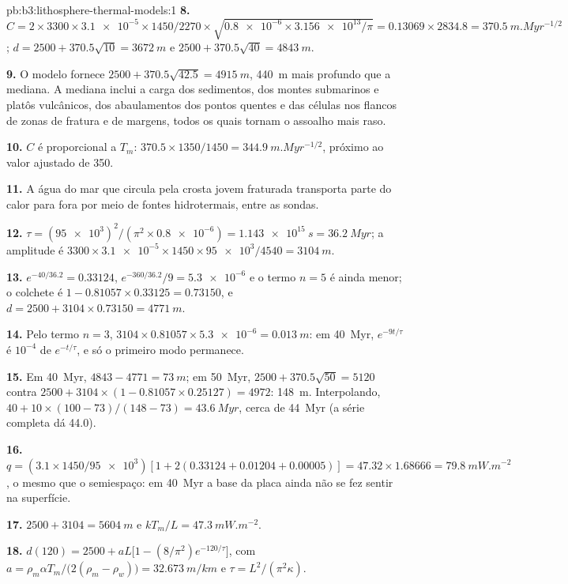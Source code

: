 \begin{solution}{pb:b3:lithosphere-thermal-models:1}
\textbf{8.} $C = 2\times3300\times\num{3.1e-5}\times1450/2270\times
\sqrt{\num{0.8e-6}\times\num{3.156e13}/\pi} = 0.13069\times2834.8 =
\qty{370.5}{m.Myr^{-1/2}}$; $d = 2500 + 370.5\sqrt{10} = \qty{3672}{m}$ e
$2500 + 370.5\sqrt{40} = \qty{4843}{m}$.

\textbf{9.} O modelo fornece $2500 + 370.5\sqrt{42.5} = \qty{4915}{m}$,
\qty{440}{m} mais profundo que a mediana. A mediana inclui a carga dos
sedimentos, dos montes submarinos e platôs vulcânicos, dos abaulamentos dos pontos quentes e
das células nos flancos de zonas de fratura e de margens, todos os quais tornam o assoalho
mais raso.

\textbf{10.} $C$ é proporcional a $T_m$: $370.5\times1350/1450 =
\qty{344.9}{m.Myr^{-1/2}}$, próximo ao valor ajustado de 350.

\textbf{11.} A água do mar que circula pela crosta jovem fraturada transporta
parte do calor para fora por meio de fontes hidrotermais, entre as sondas.

\textbf{12.} $\tau = (\num{95e3})^2/(\pi^2\times\num{0.8e-6}) =
\qty{1.143e15}{s} = \qty{36.2}{Myr}$; a amplitude é $3300\times
\num{3.1e-5}\times1450\times\num{95e3}/4540 = \qty{3104}{m}$.

\textbf{13.} $e^{-40/36.2} = 0.33124$, $e^{-360/36.2}/9 = \num{5.3e-6}$ e o
termo $n = 5$ é ainda menor; o colchete é $1 - 0.81057\times0.33125 =
0.73150$, e $d = 2500 + 3104\times0.73150 = \qty{4771}{m}$.

\textbf{14.} Pelo termo $n = 3$, $3104\times0.81057\times\num{5.3e-6} =
\qty{0.013}{m}$: em \qty{40}{Myr}, $e^{-9t/\tau}$ é $10^{-4}$ de
$e^{-t/\tau}$, e só o primeiro modo permanece.

\textbf{15.} Em \qty{40}{Myr}, $4843 - 4771 = \qty{73}{m}$; em
\qty{50}{Myr}, $2500 + 370.5\sqrt{50} = 5120$ contra $2500 + 3104\times(1 -
0.81057\times0.25127) = 4972$: \qty{148}{m}. Interpolando, $40 + 10\times
(100 - 73)/(148 - 73) = \qty{43.6}{Myr}$, cerca de \qty{44}{Myr} (a série completa
dá 44.0).

\textbf{16.} $q = (3.1\times1450/\num{95e3})[1 + 2(0.33124 + 0.01204 +
0.00005)] = 47.32\times1.68666 = \qty{79.8}{mW.m^{-2}}$, o mesmo que o
semiespaço: em \qty{40}{Myr} a base da placa ainda não se fez sentir na
superfície.

\textbf{17.} $2500 + 3104 = \qty{5604}{m}$ e $kT_m/L = \qty{47.3}{mW.m^{-2}}$.

\textbf{18.} $d(120) = 2500 + aL\bigl[1 - (8/\pi^2)e^{-120/\tau}\bigr]$, com
$a = \rho_m\alpha T_m/\bigl(2(\rho_m - \rho_w)\bigr) = \qty{32.673}{m/km}$ e
$\tau = L^2/(\pi^2\kappa)$.


\end{solution}

